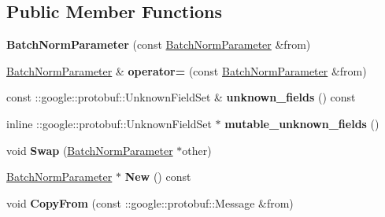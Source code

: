 \subsection*{Public Member Functions}
\begin{DoxyCompactItemize}
\item 
\mbox{\label{classcaffe_1_1_batch_norm_parameter_a8c87c88910e67dca458ee99e8c1a6308}} 
{\bfseries Batch\+Norm\+Parameter} (const \mbox{\hyperlink{classcaffe_1_1_batch_norm_parameter}{Batch\+Norm\+Parameter}} \&from)
\item 
\mbox{\label{classcaffe_1_1_batch_norm_parameter_a5811486a97735f738609b158ea96238d}} 
\mbox{\hyperlink{classcaffe_1_1_batch_norm_parameter}{Batch\+Norm\+Parameter}} \& {\bfseries operator=} (const \mbox{\hyperlink{classcaffe_1_1_batch_norm_parameter}{Batch\+Norm\+Parameter}} \&from)
\item 
\mbox{\label{classcaffe_1_1_batch_norm_parameter_a4e94cabd70108e206ec63b00eb04d11c}} 
const \+::google\+::protobuf\+::\+Unknown\+Field\+Set \& {\bfseries unknown\+\_\+fields} () const
\item 
\mbox{\label{classcaffe_1_1_batch_norm_parameter_a86a98559df45442090d56eb35f7f0286}} 
inline \+::google\+::protobuf\+::\+Unknown\+Field\+Set $\ast$ {\bfseries mutable\+\_\+unknown\+\_\+fields} ()
\item 
\mbox{\label{classcaffe_1_1_batch_norm_parameter_accf053ee05348fc73773fbddb631eeeb}} 
void {\bfseries Swap} (\mbox{\hyperlink{classcaffe_1_1_batch_norm_parameter}{Batch\+Norm\+Parameter}} $\ast$other)
\item 
\mbox{\label{classcaffe_1_1_batch_norm_parameter_a826545ad70e3b5b0cfc190e9cf02acb8}} 
\mbox{\hyperlink{classcaffe_1_1_batch_norm_parameter}{Batch\+Norm\+Parameter}} $\ast$ {\bfseries New} () const
\item 
\mbox{\label{classcaffe_1_1_batch_norm_parameter_a3858cdca3acd8fa9cdefb15c256206f3}} 
void {\bfseries Copy\+From} (const \+::google\+::protobuf\+::\+Message \&from)

\end{DoxyCompactItemize}
